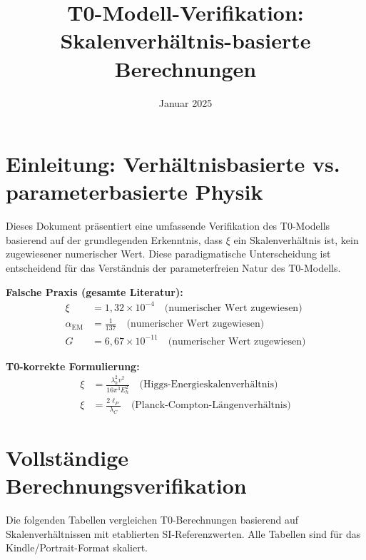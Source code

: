 \documentclass[12pt,a4paper]{article}
\begin{document}
	\title{T0-Modell-Verifikation: Skalenverhältnis-basierte Berechnungen}
	\author{}
	\date{Januar 2025}
	\maketitle
	
	\section{Einleitung: Verhältnisbasierte vs. parameterbasierte Physik}
	
	Dieses Dokument präsentiert eine umfassende Verifikation des T0-Modells basierend auf der grundlegenden Erkenntnis, dass $\xi$ ein Skalenverhältnis ist, kein zugewiesener numerischer Wert. Diese paradigmatische Unterscheidung ist entscheidend für das Verständnis der parameterfreien Natur des T0-Modells.
	
	\begin{tcolorbox}[colback=red!5!white,colframe=red!75!black,title=Grundlegender Literaturfehler]
		\textbf{Falsche Praxis (gesamte Literatur):}
		\begin{align}
			\xi &= 1,32 \times 10^{-4} \quad \text{(numerischer Wert zugewiesen)} \\
			\alpha_{\text{EM}} &= \frac{1}{137} \quad \text{(numerischer Wert zugewiesen)} \\
			G &= 6,67 \times 10^{-11} \quad \text{(numerischer Wert zugewiesen)}
		\end{align}
		
		\textbf{T0-korrekte Formulierung:}
		\begin{align}
			\xi &= \frac{\lambda_h^2 v^2}{16\pi^3 E_h^2} \quad \text{(Higgs-Energieskalenverhältnis)} \\
			\xi &= \frac{2\ell_P}{\lambda_C} \quad \text{(Planck-Compton-Längenverhältnis)}
		\end{align}
	\end{tcolorbox}
	
	\section{Vollständige Berechnungsverifikation}
	
	Die folgenden Tabellen vergleichen T0-Berechnungen basierend auf Skalenverhältnissen mit etablierten SI-Referenzwerten. Alle Tabellen sind für das Kindle/Portrait-Format skaliert.
	
\end{document}
